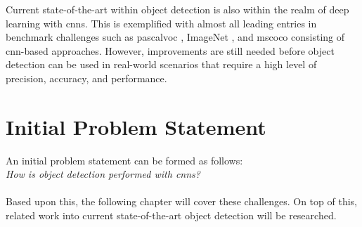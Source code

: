 Current state-of-the-art within object detection is also within the realm of deep learning with \glspl{cnn}. This is exemplified with almost all leading entries in benchmark challenges such as \gls{pascalvoc} \cite{pascalvoc2012}, ImageNet \cite{imagenet}, and \gls{mscoco} \cite{mscoco} consisting of \gls{cnn}-based approaches. However, improvements are still needed before object detection can be used in real-world scenarios that require a high level of precision, accuracy, and performance. 

\section{Initial Problem Statement}

\begin{comment}
	- what are specific problems within object detection?
	- 
\end{comment}

An initial problem statement can be formed as follows: \\

\textit{How is object detection performed with \glspl{cnn}?} \\ \\
Based upon this, the following chapter will cover these challenges. On top of this, related work into current state-of-the-art object detection will be researched.
